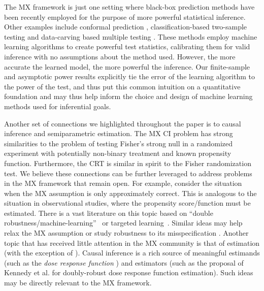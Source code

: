 \documentclass[12pt]{article}
\theoremstyle{definition}
\theoremstyle{remark}
\begin{document}

The MX framework is just one setting where black-box prediction methods have been recently employed for the purpose of more powerful statistical inference. Other examples include conformal prediction \cite{FoygelBarber2019}, classification-based two-sample testing \cite{Kim2020} and data-carving based multiple testing \cite{lei2016adapt}. These methods employ machine learning algorithms to create powerful test statistics, calibrating them for valid inference with no assumptions about the method used. However, the more accurate the learned model, the more powerful the inference. Our finite-sample and asymptotic power results explicitly tie the error of the learning algorithm to the power of the test, and thus put this common intuition on a quantitative foundation and may thus help inform the choice and design of machine learning methods used for inferential goals. 

Another set of connections we highlighted throughout the paper is to causal inference and semiparametric estimation. The MX CI problem has strong similarities to the problem of testing Fisher's strong null in a randomized experiment with potentially non-binary treatment and known propensity function. Furthermore, the CRT is similar in spirit to the Fisher randomization test. We believe these connections can be further leveraged to address problems in the MX framework that remain open. For example, consider the situation when the MX assumption is only approximately correct. This is analogous to the situation in observational studies, where the propensity score/function must be estimated. There is a vast literature on this topic based on ``double robustness/machine-learning''~\cite{Chernozhukov2018} or targeted learning~\cite{VanderLaan2011}. Similar ideas may help relax the MX assumption \cite{Huang2019} or study robustness to its misspecification \cite{Barber2018}. Another topic that has received little attention in the MX community is that of estimation (with the exception of \cite{Zhang2020}). Causal inference is a rich source of meaningful estimands (such as the \textit{dose response function} \cite{Hirano2004}) and estimators (such as the proposal of Kennedy et al. \cite{Kennedy2017} for doubly-robust dose response function estimation). Such ideas may be directly relevant to the MX framework.
\end{document}
